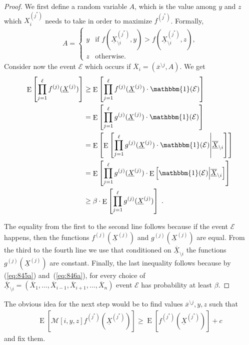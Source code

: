 \documentclass{daj}
\newcommand{\1}{\mathbbm{1}}
\theoremstyle{plain}
\theoremstyle{definition}
\DeclareMathOperator*{\EE}{E}
\newcommand{\cE}{\mathcal{E}}
\newcommand{\cM}{\mathcal{M}}
\begin{document}
\begin{proof}
We first define a random variable $A$, 
which is the value among $y$ and $z$ which $X_{i}^{(j^*)}$ needs to take 
in order to maximize $f^{(j^*)}$. 
Formally,
\begin{align}
  A = \begin{cases}
    y & \text{if 
      $f\left(\underline{X}^{(j^*)}_{\setminus i}, y\right) 
      > f\left(\underline{X}^{(j^*)}_{\setminus i}, z\right)$,} \\
    z & \text{otherwise.}
\end{cases}
\end{align}
Consider now the event $\cE$ which occurs if 
$\overline{X}_i = (\overline{x}^{\setminus j}, A)$.
We get
\begin{align*}
\EE\left[\prod_{j=1}^{\ell} f^{(j)}(\underline{X}^{(j)})\right]
&\geq
\EE\left[
\prod_{j=1}^{\ell} f^{(j)}(\underline{X}^{(j)}) \cdot \1(\mathcal{E})
 \right]
\\
&=
\EE\left[
\prod_{j=1}^{\ell} g^{(j)}(\underline{X}^{(j)}) \cdot \1(\mathcal{E})
 \right]\\
&=
\EE\left[
\EE\left[
\prod_{j=1}^{\ell} g^{(j)}(\underline{X}^{(j)}) \cdot \1(\mathcal{E})
\middle | 
\overline{\underline{X}}_{\setminus i}
\right]
\right]\\
&=
\EE\left[
\prod_{j=1}^{\ell} g^{(j)}(\underline{X}^{(j)}) \cdot
\EE\left[
\1(\mathcal{E})
\middle | 
\overline{\underline{X}}_{\setminus i}
\right]
\right]\\
&\geq
\beta \cdot
\EE\left[
\prod_{j=1}^{\ell} g^{(j)}(\underline{X}^{(j)})
\right] \; .
\end{align*}

The equality from the first to the second line follows because
if the event $\cE$ happens, then the functions 
$f^{(j)}(\underline{X}^{(j)})$ 
and $g^{(j)}(\underline{X}^{(j)})$ are equal.
From the third to the fourth line we use that conditioned on 
$\underline{\overline{X}}_{\setminus i}$ the 
functions $g^{(j)}(\underline{X}^{(j)})$ are constant.
Finally, the last inequality follows because by (\ref{eq:845a})
and~(\ref{eq:846a}), for every choice of
$\underline{\overline{X}}_{\setminus i} = 
(\overline{X}_1,\ldots,\overline{X}_{i-1},
\overline{X}_{i+1},\ldots,\overline{X}_{n})$ event $\mathcal{E}$
has probability at least $\beta$.
\end{proof}

The obvious idea for the next step would be to 
find values $\overline{x}^{\setminus j}, y, z$
such that 
\begin{align*}
\EE\left[\cM[i,y,z]f^{(j^*)}(\underline{X}^{(j^*)})\right] \geq 
\EE\left[f^{(j^*)}(\underline{X}^{(j^*)})\right]+c
\end{align*}
and fix them.
\end{document}
